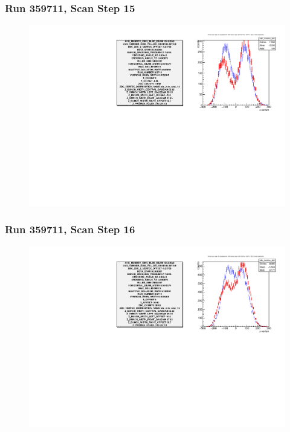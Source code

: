 \begin{frame}
\frametitle{Run 359711, Scan Step 15}
\begin{figure}
\begin{center}
\includegraphics[width=\linewidth]{"figs/359711_step_15_zdc_zvertex"}
\caption{ }
\label{fig:359711_step_15_zdc_zvertex}
\end{center}\end{figure}
\end{frame}

\begin{frame}
\frametitle{Run 359711, Scan Step 16}
\begin{figure}
\begin{center}
\includegraphics[width=\linewidth]{"figs/359711_step_16_zdc_zvertex"}
\caption{ }
\label{fig:359711_step_16_zdc_zvertex}
\end{center}\end{figure}
\end{frame}

